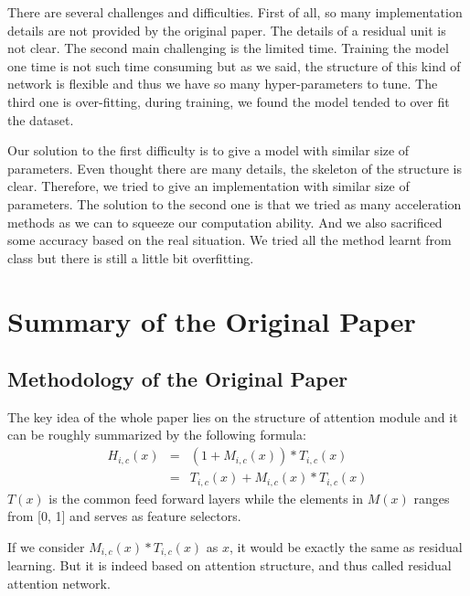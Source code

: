 \documentclass{article}
\begin{document}
\newpage
\begin{multicols}{2}
There are several challenges and difficulties. First of all, so many implementation details are not provided by the original paper. The details of a residual unit is not clear. The second main challenging is the limited time. Training the model one time is not such time consuming but as we said, the structure of this kind of network is flexible and thus we have so many hyper-parameters to tune. The third one is over-fitting, during training, we found the model tended to over fit the dataset.

Our solution to the first difficulty is to give a model with similar size of parameters. Even thought there are many details, the skeleton of the structure is clear. Therefore, we tried to give an implementation with similar size of parameters. The solution to the second one is that we tried as many acceleration methods as we can to squeeze our computation ability. And we also sacrificed some accuracy based on the real situation. We tried all the method learnt from class but there is still a little bit overfitting. 





\section{Summary of the Original Paper}

\subsection{Methodology of the Original Paper}
The key idea of the whole paper lies on the structure of attention module and it can be roughly summarized by the following formula:
\begin{eqnarray*}
H_{i,c}(x)&=&(1+M_{i,c}(x))*T_{i, c}(x) \\
&=&T_{i, c}(x) + M_{i,c}(x)*T_{i, c}(x)
\label{eqn:attention_module}
\end{eqnarray*}
$T(x)$ is the common feed forward layers while the elements in $M(x)$ ranges from [0, 1] and serves as feature selectors. 

If we consider $M_{i,c}(x)*T_{i, c}(x)$ as $x$, it would be exactly the same as residual learning. But it is indeed based on attention structure, and thus called residual attention network.


\end{multicols}
\end{document}

